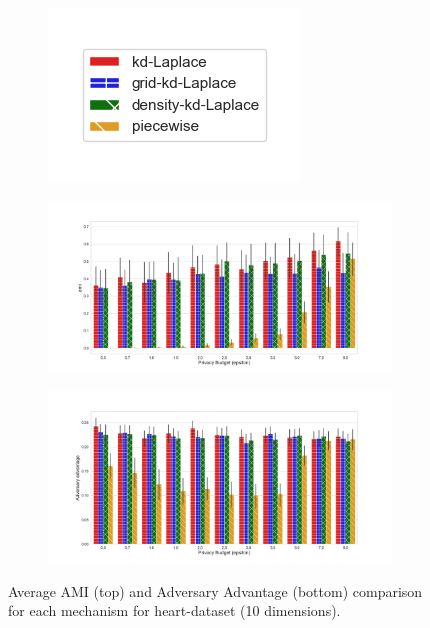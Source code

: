 \begin{figure}[H]
  \centering
  \begin{subfigure}{0.30\textwidth}
    \includegraphics[width=\textwidth]{Results/kd-laplace/ami_bar_comparison_legend.png}
  \end{subfigure}
  \begin{subfigure}{1\textwidth}
    \includegraphics[width=1\textwidth]{Results/kd-laplace/ami_heart-dataset_comparison.png}
  \end{subfigure}
  \begin{subfigure}{1\textwidth}
    \includegraphics[width=1\textwidth]{Results/kd-laplace/shokri_mi_adv_heart-dataset_comparison.png}
  \end{subfigure}
  \caption{Average AMI (top) and Adversary Advantage (bottom) comparison for each mechanism for heart-dataset (10 dimensions).}
  \label{fig:utility_heart-dataset_comparison_nd_plot}
\end{figure}
\newpage


